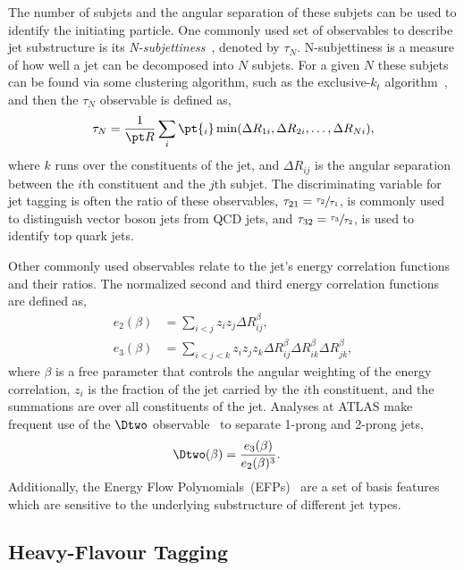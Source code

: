 The number of subjets and the angular separation of these subjets can be used to identify the initiating particle.
One commonly used set of observables to describe jet substructure is its \emph{N-subjettiness}~\cite{Subjet}, denoted by ${\tau_N}$.
N-subjettiness is a measure of how well a jet can be decomposed into $N$ subjets.
For a given $N$ these subjets can be found via some clustering algorithm, such as the exclusive-$k_t$ algorithm~\cite{ExclusiveKT}, and then the $\tau_N$ observable is defined as,
\begin{equation}
    \tau_N = \frac{1}{\pt R} \sum_{i} \pt{_i}
    \min(\Delta R_{1i}, \Delta R_{2i}, \ldots, \Delta R_{Ni}),
\end{equation}
where $k$ runs over the constituents of the jet, and $\Delta R_{ij}$ is the angular separation between the $i$th constituent and the $j$th subjet.
The discriminating variable for jet tagging is often the ratio of these observables, $\tau_{21} = \sfrac{\tau_2}{\tau_1}$, is commonly used to distinguish vector boson jets from QCD jets, and
$\tau_{32} = \sfrac{\tau_3}{\tau_2}$, is used to identify top quark jets.

Other commonly used observables relate to the jet's energy correlation functions~\cite{ECF} and their ratios.
The normalized second and third energy correlation functions are defined as,
\begin{align}
    e_{2}(\beta) & = \sum_{i < j} z_i z_j \Delta R_{ij}^\beta,                                                       \\
    e_{3}(\beta) & = \sum_{i < j < k} z{_i} z{_j} z{_k} \Delta R_{ij}^\beta \Delta R_{ik}^\beta \Delta R_{jk}^\beta,
\end{align}
where $\beta$ is a free parameter that controls the angular weighting of the energy correlation, $z_i$ is the \pt fraction of the jet carried by the $i$th constituent, and the summations are over all constituents of the jet.
Analyses at ATLAS make frequent use of the $\Dtwo$ observable~\cite{ATLASD2} to separate 1-prong and 2-prong jets,
\begin{align}
    \Dtwo(\beta) & = \frac{e_3(\beta)}{e_2(\beta)^3}.
\end{align}
Additionally, the Energy Flow Polynomials~(EFPs)~\cite{EFP} are a set of basis features which are sensitive to the underlying substructure of different jet types.

\subsection{Heavy-Flavour Tagging}
\label{sec:flavour_tagging}

